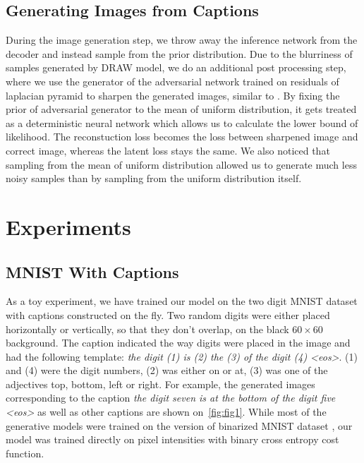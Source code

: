 \documentclass{article} %
\begin{document}
\subsection{Generating Images from Captions}

During the image generation step, we throw away the inference network from the decoder and instead sample from the prior distribution. Due to the blurriness of samples generated by DRAW model, we do an additional post processing step, where we use the generator of the adversarial network trained on residuals of laplacian pyramid to sharpen the generated images, similar to \citep{denton_lapgan}. By fixing the prior of adversarial generator to the mean of uniform distribution, it gets treated as a deterministic neural network which allows us to calculate the lower bound of likelihood. The reconstuction loss becomes the loss between sharpened image and correct image, whereas the latent loss stays the same. We also noticed that sampling from the mean of uniform distribution allowed us to generate much less noisy samples than by sampling from the uniform distribution itself.  

\section{Experiments}
\subsection{MNIST With Captions}
As a toy experiment, we have trained our model on the two digit MNIST dataset with captions constructed on the fly. Two random digits were either placed horizontally or vertically, so that they don't overlap, on the black $60 \times 60$ background. The caption indicated the way digits were placed in the image and had the following template: \textit{the digit (1) is (2) the (3) of the digit (4) \textless eos\textgreater}. (1) and (4) were the digit numbers, (2) was either on or at, (3) was one of the adjectives top, bottom, left or right. For example, the generated images corresponding to the caption \textit{the digit seven is at the bottom of the digit five \textless eos\textgreater} as well as other captions are shown on~\ref{fig:fig1}. While most of the generative models were trained on the version of binarized MNIST dataset \citep{russ_binarizedmnist}, our model was trained directly on pixel intensities with binary cross entropy cost function.
\end{document}

